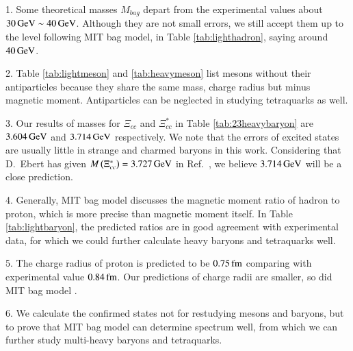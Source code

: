 \documentclass[prd,twocolumn,floatfix,nofootinbib]{revtex4}
\begin{document}
1. Some theoretical masses $M_{bag}$ depart from the experimental values about $30\,{\rm GeV}\sim 40\,{\rm GeV}$. 
Although they are not small errors, we still accept them up to the level following MIT bag model, in Table \ref{tab:lighthadron}, saying around $40\,{\rm GeV}$.

2. Table \ref{tab:lightmeson} and \ref{tab:heavymeson} list mesons without their antiparticles because they share the same mass, charge radius but minus magnetic moment.
Antiparticles can be neglected in studying tetraquarks as well.

3. Our results of masses for $\Xi_{cc}$ and $\Xi_{cc}^{\ast}$ in Table \ref{tab:23heavybaryon} are $3.604\,{\rm GeV}$ and $3.714\,{\rm GeV}$ respectively.
We note that the errors of excited states are usually little in strange and charmed baryons in this work. 
Considering that D.~Ebert has given $M\left(\Xi_{cc}^{\ast}\right)=3.727\,{\rm GeV}$ in Ref.~\cite{Ebert:2004ck}, we believe $3.714\,{\rm GeV}$ will be a close prediction.

4. Generally, MIT bag model discusses the magnetic moment ratio of hadron to proton, which is more precise than magnetic moment itself.
In Table \ref{tab:lightbaryon}, the predicted ratios are in good agreement with experimental data, for which we could further calculate heavy baryons and tetraquarks well.

5. The charge radius of proton is predicted to be $0.75\,{\rm fm}$ comparing with experimental value $0.84\,{\rm fm}$.
Our predictions of charge radii are smaller, so did MIT bag model \cite{Johnson:1975zp,DeGrand:1975cf}.

6. We calculate the confirmed states not for restudying mesons and baryons, but to prove that MIT bag model can determine spectrum well, from which we can further study multi-heavy baryons and tetraquarks.
\end{document}
